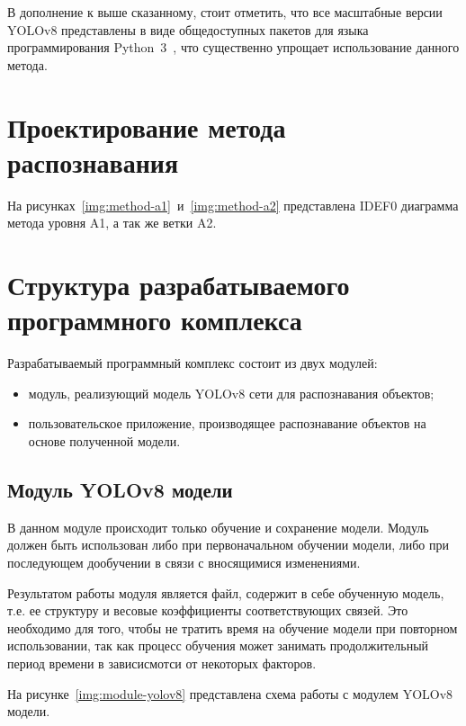 В дополнение к выше сказанному, стоит отметить, что все масштабные версии YOLOv8 представлены в виде общедоступных пакетов для языка программирования Python~3~\cite{python3}, что существенно упрощает использование данного метода.

\section{Проектирование метода распознавания}

На рисунках~\ref{img:method-a1}~и~\ref{img:method-a2} представлена IDEF0 диаграмма метода уровня A1, а так же ветки A2.



\section{Структура разрабатываемого программного комплекса}

Разрабатываемый программный комплекс состоит из двух модулей:
\begin{itemize}[label=---]
    \item модуль, реализующий модель YOLOv8 сети для распознавания объектов;
    \item пользовательское приложение, производящее распознавание объектов на основе полученной модели.
\end{itemize}

\subsection*{Модуль YOLOv8 модели}

В данном модуле происходит только обучение и сохранение модели. Модуль должен быть использован либо при первоначальном обучении модели, либо при последующем дообучении в связи с вносящимися изменениями.

Результатом работы модуля является файл, содержит в себе обученную модель, т.е. ее структуру и весовые коэффициенты соответствующих связей. Это необходимо для того, чтобы не тратить время на обучение модели при повторном использовании, так как процесс обучения может занимать продолжительный период времени в зависисмотси от некоторых факторов.

На рисунке~\ref{img:module-yolov8} представлена схема работы с модулем YOLOv8 модели.

